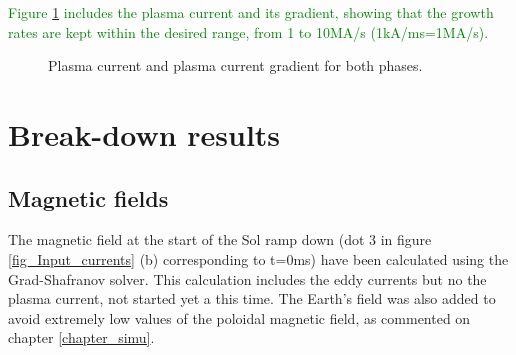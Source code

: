 \documentclass[a4paper,12pt,oneside]{book}
\begin{document}
\textcolor{green}{Figure \ref{fig_Ip} includes the plasma current and its gradient, showing that the growth rates are kept within the desired range, from 1 to 10MA/s (1kA/ms=1MA/s).}

\begin{figure}[t]
\centering
{}
\hfill
{}

\hfill
{}

\caption{Plasma current and plasma current gradient for both phases.}
\label{fig_Ip}
\end{figure}

\section{Break-down results}

\subsection{Magnetic fields}
\label{sec_results_fields}

The magnetic field at the start of the Sol ramp down (dot 3 in figure \ref{fig_Input_currents} (b) corresponding to t=0ms) have been calculated using the Grad-Shafranov solver. This calculation includes the eddy currents but no the plasma current, not started yet a this time.
%
The Earth's field was also added to avoid extremely low values of the poloidal magnetic field, as commented on chapter \ref{chapter_simu}.
\end{document}
